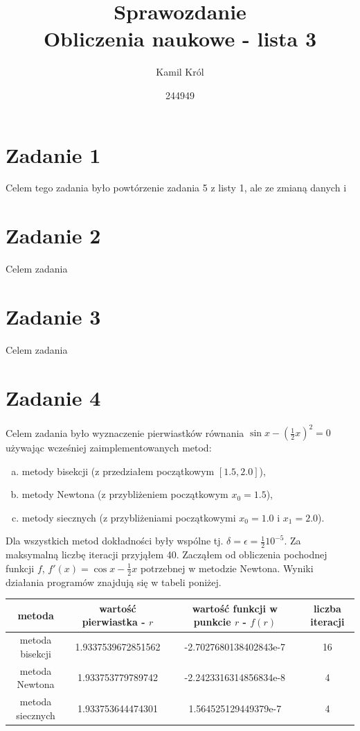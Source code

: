 \documentclass[]{article}
\title{
	Sprawozdanie \\
	\large 
	Obliczenia naukowe - lista 3}
\author{Kamil Król}
\date{244949}
\begin{document}
	
	\maketitle
	
	\section*{Zadanie 1}
	Celem tego zadania było powtórzenie zadania 5 z listy 1, ale ze zmianą danych i 
	
	\section*{Zadanie 2}
	
	Celem zadania 

	\section*{Zadanie 3} 
	
	Celem zadania 
	
	\section*{Zadanie 4}

	Celem zadania było wyznaczenie pierwiastków równania $\sin{x}-(\frac{1}{2}x)^2 = 0$ używając wcześniej zaimplementowanych metod:
	\begin{enumerate}[(a)]
		\item metody bisekcji (z przedziałem początkowym $[1.5, 2.0]$),
		\item metody Newtona (z przybliżeniem początkowym $x_0 = 1.5$),  
		\item metody siecznych (z przybliżeniami początkowymi $x_0 = 1.0$ i $x_1 = 2.0$).
	\end{enumerate}
	Dla wszystkich metod dokładności były wspólne tj. $\delta = \epsilon = \frac{1}{2}10^{-5}$. Za maksymalną liczbę iteracji przyjąłem 40. Zacząłem od obliczenia pochodnej funkcji $f$, $f'(x) = \cos{x} - \frac{1}{2}x$ potrzebnej w metodzie Newtona. Wyniki działania programów znajdują się w tabeli poniżej.
	
	\begin{table}[h!]
		\centering
		\label{tab:table1}
		\begin{tabular}{|c|c|c|c|}
			\hline
			metoda & wartość pierwiastka - $r$ & wartość funkcji w punkcie $r$ - $f(r)$ & liczba iteracji \\ \hline
			metoda bisekcji & 1.9337539672851562 & -2.7027680138402843e-7 & 16 \\ \hline
			metoda Newtona & 1.933753779789742 & -2.2423316314856834e-8 & 4 \\ \hline
			metoda siecznych & 1.933753644474301 & 1.564525129449379e-7 & 4 \\ \hline
		\end{tabular}
	\end{table}
	
\end{document}
